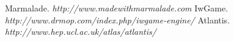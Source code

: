 \documentclass[12pt]{article}
\begin{document}
\begin{thebibliography}{9}

  Marmalade. \emph{http://www.madewithmarmalade.com}
  IwGame. \emph{http://www.drmop.com/index.php/iwgame-engine/}
  Atlantis. \emph{http://www.hep.ucl.ac.uk/atlas/atlantis/}
\end{thebibliography}
\end{document}
